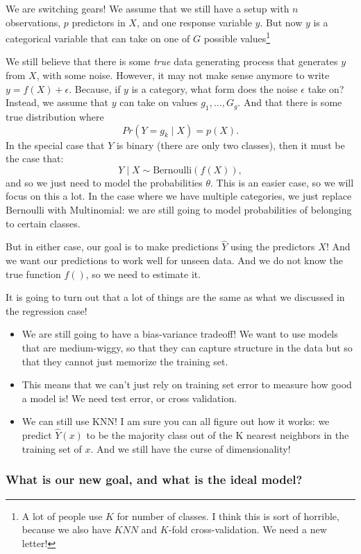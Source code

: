 We are switching gears! We assume that we still have a setup with $n$ observations, $p$ predictors in $X$, and one response variable $y$. But now $y$ is a categorical variable that can take on one of $G$ possible values\footnote{A lot of people use $K$ for number of classes. I think this is sort of horrible, because we also have $KNN$ and $K$-fold cross-validation. We need a new letter!}

We still believe that there is some \emph{true} data generating process that generates $y$ from $X$, with some noise. However, it may not make sense anymore to write $y = f(X) + \epsilon$. Because, if $y$ is a category, what form does the noise $\epsilon$ take on? Instead, we assume that $y$ can take on values $g_1,\ldots, G_g$. And that there is some true distribution where
$$
Pr(Y=g_k \mid X) = p(X). 
$$
In the special case that $Y$ is binary (there are only two classes), then  it must be the case that:
$$
Y \mid X \sim \mathrm{Bernoulli}(f(X)), 
$$
and so we just need to model the probabilities $\theta$.  This is an easier case, so we will focus on this a lot. In the case where we have multiple categories, we just replace $\mathrm{Bernoulli}$ with $\mathrm{Multinomial}$: we are still going to model probabilities of belonging to certain classes. 

But in either case, our goal is to make predictions $\hat{Y}$ using the predictors $X$! And we want our predictions to work well for unseen data. And we do not know the true function $f()$, so we need to estimate it. 

It is going to turn out that a lot of things are the same as what we discussed in the regression case!
\begin{itemize}
\item We are still going to have a bias-variance tradeoff! We want to use models that are medium-wiggy, so that they can capture structure in the data but so that they cannot just memorize the training set. 
\item This means that we can't just rely on training set error to measure how good a model is! We need test error, or cross validation. 
\item We can still use KNN! I am sure you can all figure out how it works: we predict $\hat{Y}(x)$ to be the majority class out of the K nearest neighbors in the training set of $x$. And we still have the curse of dimensionality!	
\end{itemize}

\subsubsection{What is our new goal, and what is the ideal model?}

